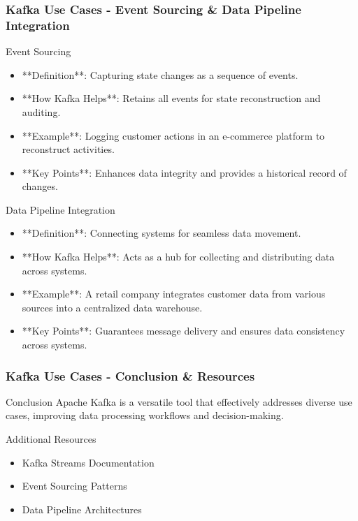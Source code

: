 \documentclass[aspectratio=169]{beamer}
\begin{document}
\begin{frame}[fragile]
    \frametitle{Kafka Use Cases - Event Sourcing \& Data Pipeline Integration}
    \begin{block}{Event Sourcing}
        \begin{itemize}
            \item **Definition**: Capturing state changes as a sequence of events.
            \item **How Kafka Helps**: Retains all events for state reconstruction and auditing.
            \item **Example**: Logging customer actions in an e-commerce platform to reconstruct activities.
            \item **Key Points**: Enhances data integrity and provides a historical record of changes.
        \end{itemize}
    \end{block}
    
    \begin{block}{Data Pipeline Integration}
        \begin{itemize}
            \item **Definition**: Connecting systems for seamless data movement.
            \item **How Kafka Helps**: Acts as a hub for collecting and distributing data across systems.
            \item **Example**: A retail company integrates customer data from various sources into a centralized data warehouse.
            \item **Key Points**: Guarantees message delivery and ensures data consistency across systems.
        \end{itemize}
    \end{block}
\end{frame}

\begin{frame}[fragile]
    \frametitle{Kafka Use Cases - Conclusion \& Resources}
    \begin{block}{Conclusion}
        Apache Kafka is a versatile tool that effectively addresses diverse use cases, improving data processing workflows and decision-making.
    \end{block}
    
    \begin{block}{Additional Resources}
        \begin{itemize}
            \item Kafka Streams Documentation
            \item Event Sourcing Patterns
            \item Data Pipeline Architectures
        \end{itemize}
    \end{block}
\end{frame}
\end{document}
